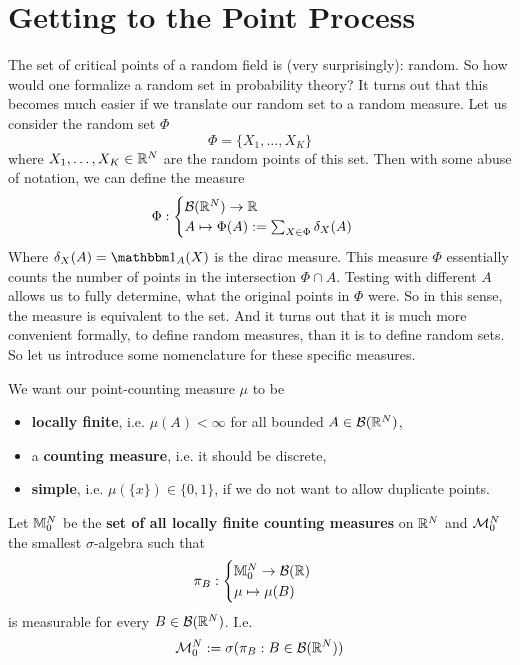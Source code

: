\section{Getting to the Point Process}

The set of critical points of a random field is (very surprisingly): random.
So how would one formalize a random set in probability theory? It turns
out that this becomes much easier if we translate our random set to a random
measure. Let us consider the random set \(\Phi\)
\[
	\Phi = \{ X_1, \dots, X_K\}
\]
where \(X_1,\dots, X_K\in\mathbb{R}^N\) are the random points of this set. Then with some
abuse of notation, we can define the measure
\[
	\Phi :
	\begin{cases}
		\mathcal{B}(\mathbb{R}^N) \to \mathbb{R} \\
		A \mapsto \Phi(A):= \sum_{X\in \Phi}\delta_X(A) 
	\end{cases}
\]
Where \(\delta_X(A)=\ind_A(X)\) is the dirac measure. This measure \(\Phi\)
essentially counts the number of points in the intersection \(\Phi\cap A\).
Testing with different \(A\) allows us to fully determine, what
the original points in \(\Phi\) were. So in this sense, the measure is
equivalent to the set. And it turns out that it is much more convenient
formally, to define random measures, than it is to define random sets.
So let us introduce some nomenclature for these specific measures.

We want our point-counting measure \(\mu\) to be
\begin{itemize}
	\item \textbf{locally finite}, i.e. \(\mu(A) < \infty\) for all bounded
	\(A\in\mathcal{B}(\mathbb{R}^N)\),
	\item a \textbf{counting measure}, i.e. it should be discrete,
	\item \textbf{simple}, i.e. \(\mu(\{x\})\in\{0,1\}\), if we do not want
	to allow duplicate points.
\end{itemize}
Let \(\mathbb{M}^{N}_0\) be the \textbf{set of all locally finite counting measures}
on \(\mathbb{R}^N\) and \(\mathcal{M}^{N}_0\) the smallest \(\sigma\)-algebra
such that
\[
	\pi_B : \begin{cases}
		\mathbb{M}^{N}_0 \to \mathcal{B}(\mathbb{R})\\
		\mu \mapsto \mu(B)
	\end{cases}
\]
is measurable for every \(B\in\mathcal{B}(\mathbb{R}^N)\). I.e.
\[
	\mathcal{M}^{N}_0 := \sigma(\pi_B : B\in\mathcal{B}(\mathbb{R}^N))
\]

